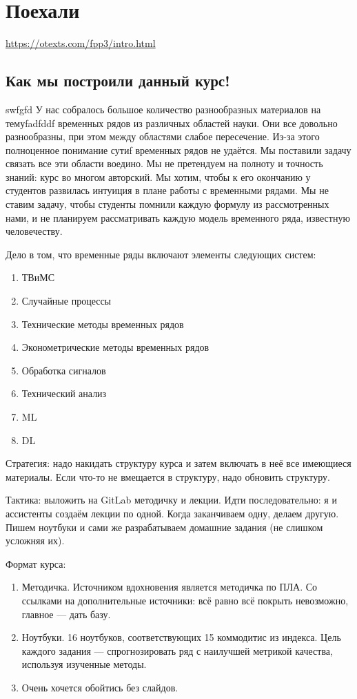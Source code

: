 \chapter{Поехали}
\url{https://otexts.com/fpp3/intro.html}

\section{Как мы построили данный курс!}
swfgfd
У нас собралось большое количество разнообразных материалов на
темуfadfddf
временных рядов из различных областей науки. Они все
довольно разнообразны, при этом между областями слабое пересечение.
Из-за этого полноценное понимание сутиf
временных рядов не удаётся. Мы поставили задачу
связать все эти области воедино. Мы не претендуем на полноту и
точность знаний: курс во многом авторский. Мы хотим, чтобы к  его
окончанию у студентов развилась интуиция в плане работы с временными
рядами. Мы не ставим задачу, чтобы студенты помнили каждую формулу из
рассмотренных нами, и не планируем рассматривать каждую модель
временного ряда, известную человечеству.

Дело в том, что временные ряды включают элементы следующих систем:
\begin{enumerate}
  \item ТВиМС
  \item Случайные процессы
  \item Технические методы временных рядов
  \item Эконометрические методы временных рядов
  \item Обработка сигналов
  \item Технический анализ
  \item ML
  \item DL
\end{enumerate}

Стратегия: надо накидать структуру курса и затем включать в неё все
имеющиеся материалы. Если что-то не вмещается в структуру, надо
обновить структуру. 

Тактика: выложить на GitLab методичку и лекции. Идти последовательно:
я и ассистенты создаём лекции по одной. Когда заканчиваем одну,
делаем другую. Пишем ноутбуки и сами же разрабатываем домашние
задания (не слишком усложняя их).

Формат курса:
\begin{enumerate}
  \item Методичка. Источником вдохновения является методичка по ПЛА.
    Со ссылками на дополнительные источники: всё равно всё покрыть
    невозможно, главное — дать базу.
  \item Ноутбуки. 16 ноутбуков, соответствующих 15 коммодитис из
    индекса. Цель каждого задания — спрогнозировать ряд с наилучшей
    метрикой качества, используя изученные методы.
  \item Очень хочется обойтись без слайдов.
\end{enumerate}


